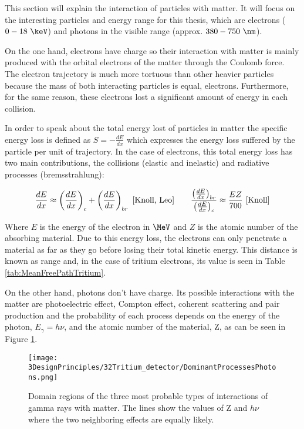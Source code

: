 This section will explain the interaction of particles with matter. It will focus on the interesting particles and energy range for this thesis, which are electrons ($0-18~\keV$) and photons in the visible range (approx. $380-750~\nm$).

On the one hand, electrons have charge so their interaction with matter is mainly produced with the orbital electrons of the matter through the Coulomb force. The electron trajectory is much more tortuous than other heavier particles because the mass of both interacting particles is equal, electrons. Furthermore, for the same reason, these electrons lost a significant amount of energy in each collision.

In order to speak about the total energy lost of particles in matter the specific energy loss is defined as $S=-\frac{dE}{dx}$ which expresses the energy loss suffered by the particle per unit of trajectory. In the case of electrons, this total energy loss has two main contributions, the collisions (elastic and inelastic) and radiative processes (bremsstrahlung):

\begin{equation}
\frac{dE}{dx} \approx \left(\frac{dE}{dx}\right)_{c} + \left(\frac{dE}{dx}\right)_{br} ~\cite{Knoll, Leo} \qquad  \frac{\left(\frac{dE}{dx}\right)_{br}}{\left(\frac{dE}{dx}\right)_{c}} \approx \frac{EZ}{700} ~\cite{Knoll}
\label{eq:ElectronInteraction}
\end{equation}

Where $E$ is the energy of the electron in $\MeV$ and $Z$ is the atomic number of the absorbing material. Due to this energy loss, the electrons can only penetrate a material as far as they go before losing their total kinetic energy. This distance is known as range and, in the case of tritium electrons, its value is seen in Table \ref{tab:MeanFreePathTritium}.

On the other hand, photons don't have charge. Its possible interactions with the matter are photoelectric effect, Compton effect, coherent scattering and pair production and the probability of each process depends on the energy of the photon, $E_\gamma = h\nu$, and the atomic number of the material, Z, as can be seen in Figure \ref{fig:ProcessesPhotons}.

\begin{figure}[htbp]
\centering
\texttt{[image: 3DesignPrinciples/32Tritium\_detector/DominantProcessesPhotons.png]}
\caption{Domain regions of the three most probable types of interactions of gamma rays with matter. The lines show the values of Z and $h\nu$ where the two neighboring effects are equally likely.\label{fig:ProcessesPhotons}~\cite{Knoll, Leo}}
\end{figure}

